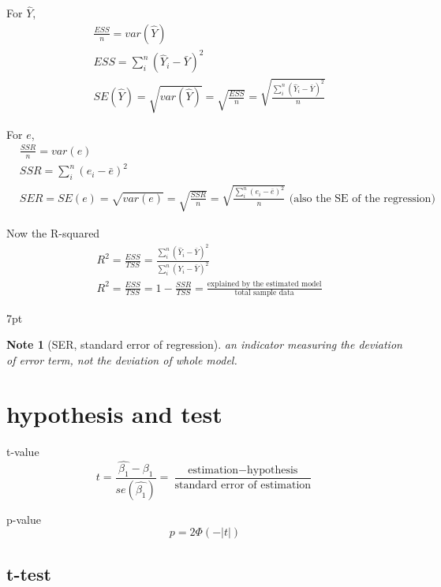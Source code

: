 \documentclass{article}
\newenvironment{blueblock}{
\def\FrameCommand{
  \hspace{1pt}
    {\color{DarkBlue}
    \vrule width 2pt}
    {\color{blueshade}
    \vrule width 4pt}
  \colorbox{blueshade}
}
\MakeFramed{
  \advance
  \hsize-
  \width
  \FrameRestore}
\noindent\hspace{-4.55pt}%
\begin{adjustwidth}{}{7pt}
\vspace{2pt}\vspace{2pt}
}
{\vspace{2pt}\end{adjustwidth}\endMakeFramed}
\newtheorem{note}{Note}
\begin{document}
For $\hat Y$,
\begin{align}
&\frac{ESS}{n}=var(\hat Y)
\\&ESS=\sum\limits_i^n (\hat Y_i-\bar Y)^2
\\&SE(\hat Y)=\sqrt{var(\hat Y)}=\sqrt{\frac{ESS}{n}}=\sqrt{\frac{\sum\limits_i^n (\hat Y_i-\bar Y)^2}{n}}
\end{align}

For $e$,
\begin{align}
&\frac{SSR}{n}=var(e)
\\&SSR=\sum\limits_i^n (e_i-\bar e)^2
\\&SER=SE(e)=\sqrt{var(e)}=\sqrt{\frac{SSR}{n}}=\sqrt{\frac{\sum\limits_i^n (e_i-\bar e)^2}{n}} \text{ (also the SE of the regression)}
\end{align}

Now the R-squared
\begin{align}
& R^2=\frac{ESS}{TSS}=\frac{\sum\limits_i^n (\hat Y_i-\bar Y)^2}{\sum\limits_i^n (Y_i-\bar Y)^2}
\\&R^2=\frac{ESS}{TSS}=1-\frac{SSR}{TSS}=\frac{\text{explained by the estimated model}}{\text{total sample data}}
\end{align}

\begin{blueblock}
\begin{note}[SER, standard error of regression]
an indicator measuring the deviation of error term, not the deviation of whole model.
\end{note}
\end{blueblock}


\section{hypothesis and test}

t-value
\begin{equation}
  t=\frac{\hat{\beta_{1}}-\beta_{1}}{se(\hat{\beta_{1}})}=\frac{\text{estimation}-\text{hypothesis}}{\text{standard error of estimation}}
\end{equation}


p-value
\begin{equation}
  p=2 \Phi(-|t|)
\end{equation}


\subsection{t-test} %
\label{sub:t_test}
\end{document}

